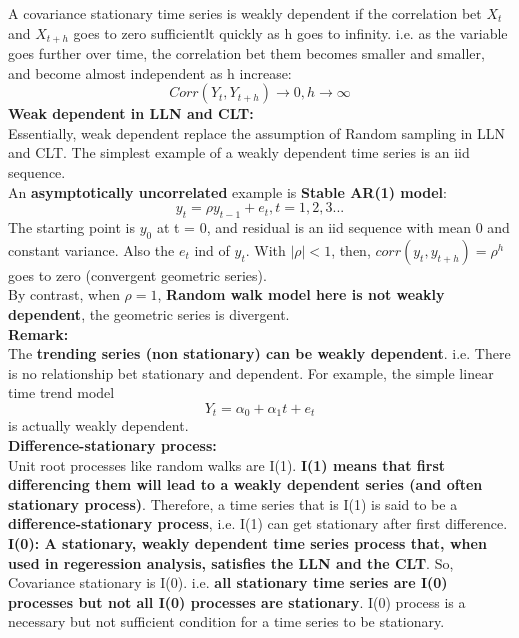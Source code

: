 \documentclass[12pt]{article}
\begin{document}
A covariance stationary time series is weakly dependent if the correlation bet  $X_t$ and $X_{t+h}$ goes to zero sufficientlt quickly as h goes to infinity. i.e. as the variable goes further over time, the correlation bet them becomes smaller and smaller, and become almost independent as h increase:
\begin{equation}
    Corr(Y_t, Y_{t+h}) \rightarrow 0,    h \rightarrow \infty
\end{equation}
\noindent
{\color{Mulberry}\textbf{Weak dependent in LLN and CLT: }}\\
Essentially, weak dependent replace the assumption of Random sampling in LLN and CLT. The simplest example of a weakly dependent time series is an iid sequence. 
\\

An \textbf{asymptotically uncorrelated} example is \textbf{Stable AR(1) model}:
\begin{equation}
    y_t = \rho y_{t-1} + e_t, t = 1,2,3 ...
\end{equation}
The starting point is $y_0$ at t = 0, and residual is an iid sequence with mean 0 and constant variance. Also the $e_t$ ind of $y_t$. With $\left|\rho\right| < 1$, then, $corr(y_t, y_{t+h}) = \rho^h$ goes to zero (convergent geometric series). \\
By contrast, when $\rho = 1$, \textbf{Random walk model here is not weakly dependent}, the geometric series is divergent. 
\\

\noindent
{\color{ForestGreen}\textbf{Remark: }} \\
The \textbf{trending series (non stationary) can be weakly dependent}. i.e. There is no relationship bet stationary and dependent.
For example, the simple linear time trend model 
$$Y_t = \alpha_0 + \alpha_1 t +e_t $$
is actually weakly dependent. 
\\

\noindent
\textbf{Difference-stationary process: }\\

Unit root processes like random walks are I(1). \textbf{I(1) means that first differencing them will lead to a weakly dependent series (and often stationary process)}. 
Therefore, a time series that is I(1) is said to be a \textbf{difference-stationary process}, i.e. I(1) can get stationary after first difference. 
\\

\textbf{I(0): A stationary, weakly dependent time series process that, when used in regeression analysis, satisfies the LLN and the CLT}. So, Covariance stationary is I(0). i.e. \textbf{all stationary time series are I(0) processes but not all I(0) processes are stationary}. I(0) process is a necessary but not sufficient condition for a time series to be stationary. 
\\
\end{document}
